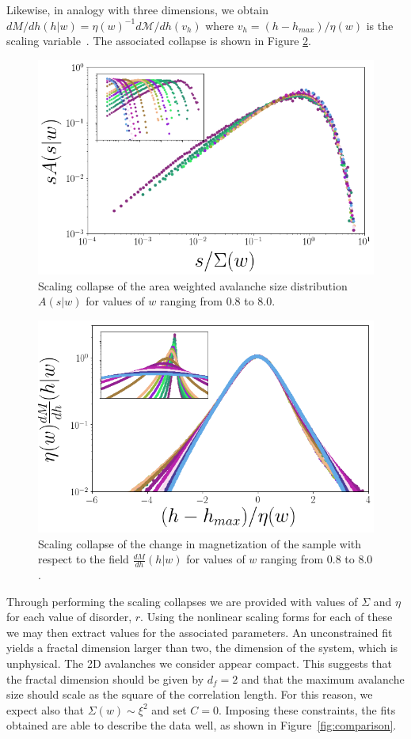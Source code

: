 \documentclass[reprint,amsmath,amssymb,aps,floatfix, prl]{revtex4-1}
\begin{document}
%
Likewise, in analogy with three dimensions, we obtain $dM/dh(h|w)=\eta(w)^{-1} d\mathcal{M}/dh(v_h)$ where $v_h=(h-h_{max})/\eta(w)$ is the scaling variable~\cite[Section~\ref{supp-app:magscale}]{RFIM2Dsupp}. The associated collapse is shown in Figure \ref{fig:dMdh_collapse}.
%
\begin{figure}
	\includegraphics[scale=0.3]{A_collapse_inset.png}
  	\caption{Scaling collapse of the area weighted avalanche size distribution $A(s|w)$ for values of $w$ ranging from $0.8$ to $8.0$.}
  	\label{fig:As_collapse}
\end{figure}
%
\begin{figure}
	\includegraphics[scale=0.3]{dMdh_collapse_inset.png}
  	\caption{ Scaling collapse of the change in magnetization of the sample with respect to the field $\frac{dM}{dh}(h|w)$ for values of $w$ ranging from $0.8$ to $8.0$. }
  	\label{fig:dMdh_collapse}
\end{figure}
%
Through performing the scaling collapses we are provided with values of $\Sigma$ and $\eta$ for each value of disorder, $r$.  Using the nonlinear scaling forms for each of these we may then extract values for the associated parameters. An unconstrained fit yields a fractal dimension larger than two, the dimension of the system, which is unphysical. The 2D avalanches we consider appear compact. This suggests that the fractal dimension should be given by $d_f=2$ and that the maximum avalanche size should scale as the square of the correlation length. For this reason, we expect also that $\Sigma(w)\sim\xi^2$ and set $C=0$. Imposing these constraints, the fits obtained are able to describe the data well, as shown in Figure~\ref{fig:comparison}.\par
\end{document}
